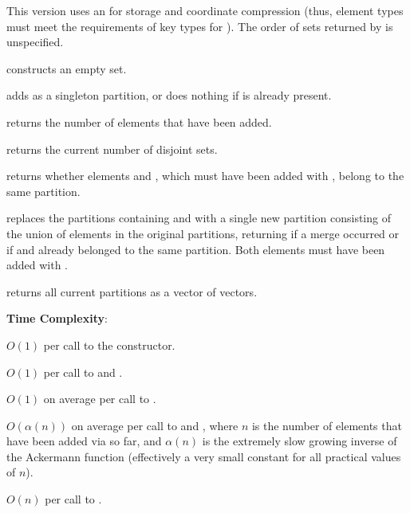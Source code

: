 This version uses an  for storage and coordinate compression (thus, element types must meet the requirements of key types for ). The order of sets returned by  is unspecified.

\begin{compactitem}
  \item {} constructs an empty set.
  \item {} adds  as a singleton partition, or does nothing if  is already present.
  \item {} returns the number of elements that have been added.
  \item {} returns the current number of disjoint sets.
  \item {} returns whether elements  and , which must have been added with , belong to the same partition.
  \item {} replaces the partitions containing  and  with a single new partition consisting of the union of elements in the original partitions, returning  if a merge occurred or  if  and  already belonged to the same partition. Both elements must have been added with .
  \item {} returns all current partitions as a vector of vectors.
\end{compactitem}

\textbf{Time Complexity}:
\begin{compactitem}
  \item $O(1)$ per call to the constructor.
  \item $O(1)$ per call to  and .
  \item $O(1)$ on average per call to .
  \item $O(\alpha\left(n\right))$ on average per call to  and , where $n$ is the number of elements that have been added via  so far, and $\alpha(n)$ is the extremely slow growing inverse of the Ackermann function (effectively a very small constant for all practical values of $n$).
  \item $O(n)$ per call to .
\end{compactitem}

